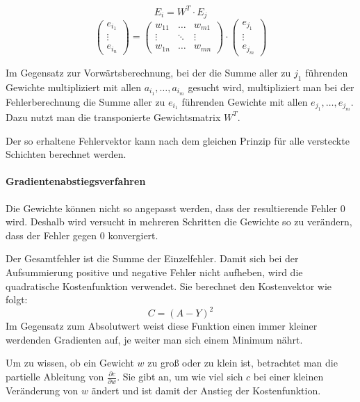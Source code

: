 \documentclass[12pt, a4paper]{article}
\begin{document}
\[E_{i} = W^T \cdot E_{j}\]
\[
\begin{pmatrix}
	e_{i_{1}} \\
	\vdots \\
	e_{i_{n}}
\end{pmatrix}
=
\begin{pmatrix}
w_{11} & \dots & w_{m1} \\
\vdots & \ddots & \vdots \\
w_{1n} & \dots & w_{mn}
\end{pmatrix}
\cdot
\begin{pmatrix}
e_{j_{1}} \\
\vdots \\
e_{j_{m}}
\end{pmatrix}
\]

Im Gegensatz zur Vorwärtsberechnung, bei der die Summe aller zu  \(j_{1}\) führenden Gewichte multipliziert mit allen \(a_{i_{1}},\dots,a_{i_{m}}\) gesucht wird, multipliziert man bei der Fehlerberechnung die Summe aller zu \(e_{i_{1}}\) führenden Gewichte  mit allen \(e_{j_{1}},\dots,e_{j_{m}}\). Dazu nutzt man die transponierte Gewichtsmatrix \(W^T\).

Der so erhaltene Fehlervektor kann nach dem gleichen Prinzip für alle versteckte Schichten berechnet werden.

\paragraph{Gradientenabstiegsverfahren}
Die Gewichte können nicht so angepasst werden, dass der resultierende Fehler 0 wird. Deshalb wird versucht in mehreren Schritten die Gewichte so zu verändern, dass der Fehler gegen 0 konvergiert.

Der Gesamtfehler ist die Summe  der Einzelfehler. Damit sich bei der Aufsummierung positive und negative Fehler nicht aufheben, wird die  quadratische Kostenfunktion verwendet. Sie berechnet den Kostenvektor wie folgt:
\[C = (A - Y)^2\]
Im Gegensatz zum Absolutwert weist diese Funktion einen immer kleiner werdenden Gradienten auf, je weiter man sich einem Minimum nährt.

Um zu wissen, ob ein Gewicht \(w\) zu groß oder zu klein ist, betrachtet man die partielle Ableitung von \(\frac{\partial c}{\partial w}\). Sie gibt an, um wie viel sich \(c\) bei einer kleinen Veränderung von \(w\) ändert  und  ist damit der Anstieg der Kostenfunktion.
\end{document}
